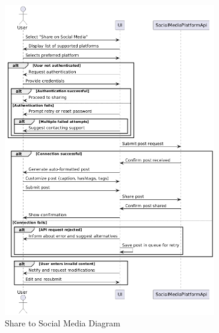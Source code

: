 \documentclass[]{article}
\begin{document}
\vspace{1.5cm}

\begin{figure}[h]
    \centering

    \begin{minipage}[b]{\textwidth}
        \centering
        \includegraphics[width=0.82\textwidth]{sharetosocialmedia.png}
        \caption{Share to Social Media Diagram}
        \label{fig:identify}
    \end{minipage}

    \vspace{0.4cm}


\end{figure}
\end{document}
